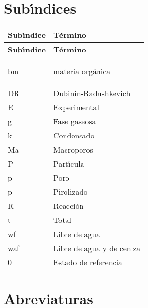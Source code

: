 \section*{Sub\'{\i}ndices}
\begin{longtable}[l]{>{}l<{}l}
  \textbf{Sub\'{\i}ndice} & \textbf{T\'{e}rmino} \\[0.5ex] \hline%
  \endfirsthead%
  \textbf{Sub\'{\i}ndice} & \textbf{T\'{e}rmino} \\[0.5ex] \hline%
  \endhead%
\renewcommand{\arraystretch}{1.4}\label{simbolosg}

 bm&materia org\'{a}nica\\%
 DR&Dubinin-Radushkevich\\%
 E&Experimental\\%
 g&Fase gaseosa\\%
 k&Condensado\\%
 Ma&Macroporos\\%
 P&Part\'{\i}cula\\%
 p&Poro\\%
 p&Pirolizado\\%
 R&Reacci\'{o}n\\%
 t&Total\\%
 wf&Libre de agua\\%
 waf&Libre de agua y de ceniza\\%
 0&Estado de referencia\\%

\end{longtable}


\section*{Abreviaturas}
